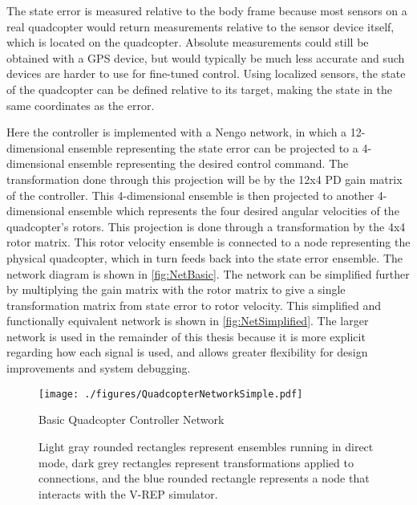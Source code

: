 \documentclass[letterpaper,12pt,titlepage,oneside,final]{book}
\begin{document}

The state error is measured relative to the body frame because most sensors on a real quadcopter would return measurements relative to the sensor device itself, which is located on the quadcopter. Absolute measurements could still be obtained with a GPS device, but would typically be much less accurate and such devices are harder to use for fine-tuned control. Using localized sensors, the state of the quadcopter can be defined relative to its target, making the state in the same coordinates as the error.

Here the controller is implemented with a Nengo network, in which a 12-dimensional ensemble representing the state error can be projected to a 4-dimensional ensemble representing the desired control command. 
The transformation done through this projection will be by the 12x4 PD gain matrix of the controller. 
This 4-dimensional ensemble is then projected to another 4-dimensional ensemble which represents the four desired angular velocities of the quadcopter's rotors. 
This projection is done through a transformation by the 4x4 rotor matrix. 
This rotor velocity ensemble is connected to a node representing the physical quadcopter, which in turn feeds back into the state error ensemble. 
The network diagram is shown in \autoref{fig:NetBasic}. 
The network can be simplified further by multiplying the gain matrix with the rotor matrix to give a single transformation matrix from state error to rotor velocity. 
This simplified and functionally equivalent network is shown in \autoref{fig:NetSimplified}.
The larger network is used in the remainder of this thesis because it is more explicit regarding how each signal is used, and allows greater flexibility for design improvements and system debugging.

\begin{figure}
\centering
\texttt{[image: ./figures/QuadcopterNetworkSimple.pdf]} %
\caption{Basic Quadcopter Controller Network}
\label{fig:NetBasic}
\captionsetup{singlelinecheck=off,font=footnotesize}
\caption*{Light gray rounded rectangles represent ensembles running in direct mode, dark grey rectangles represent transformations applied to connections, and the blue rounded rectangle represents a node that interacts with the V-REP simulator. }
\end{figure}
\end{document}
